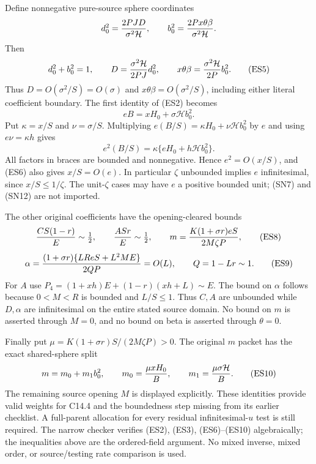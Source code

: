 Define nonnegative pure-source sphere coordinates
\[
 d_0^2={2PJD\over\sigma^2\mathcal H},\qquad
 b_0^2={2Px\theta\beta\over\sigma^2\mathcal H}.
\]
Then
\[
 d_0^2+b_0^2=1,\qquad
 D={\sigma^2\mathcal H\over2PJ}d_0^2,\qquad
 x\theta\beta={\sigma^2\mathcal H\over2P}b_0^2.
                                                               \tag{ES5}
\]
Thus $D=O(\sigma^2/S)=O(\sigma)$ and
$x\theta\beta=O(\sigma^2/S)$, including either literal coefficient
boundary. The first identity of (ES2) becomes
\[
 eB=xH_0+\sigma\mathcal H b_0^2.                     \tag{ES6}
\]
Put $\kappa=x/S$ and $\nu=\sigma/S$. Multiplying
$e(B/S)=\kappa H_0+\nu\mathcal H b_0^2$ by $e$ and using
$e\nu=\kappa h$ gives
\[
 e^2(B/S)=\kappa\{eH_0+h\mathcal H b_0^2\}.
                                                               \tag{ES7}
\]
All factors in braces are bounded and nonnegative. Hence
$e^2=O(x/S)$, and (ES6) also gives $x/S=O(e)$.
In particular $\zeta$ unbounded implies $e$ infinitesimal,
since $x/S\le1/\zeta$. The unit-$\zeta$ cases may have
$e$ a positive bounded unit; (SN7) and (SN12) are not imported.

The other original coefficients have the opening-cleared bounds
\[
 {CS(1-r)\over E}\sim\tfrac12,\qquad
 {ASr\over E}\sim\tfrac12,\qquad
 m={K(1+\sigma r)eS\over2M\zeta P},                  \tag{ES8}
\]
\[
 \alpha={(1+\sigma r)\{LR eS+L^2ME\}\over2QP}
       =O(L),\qquad Q=1-Lr\sim1.                   \tag{ES9}
\]
For $A$ use $P_4=(1+xh)E+(1-r)(xh+L)\sim E$.
The bound on $\alpha$ follows because $0<M<R$ is bounded and
$L/S\le1$. Thus $C,A$ are unbounded while $D,\alpha$ are
infinitesimal on the entire stated source domain. No bound on $m$
is asserted through $M=0$, and no bound on beta is asserted through
$\theta=0$.

Finally put $\mu=K(1+\sigma r)S/(2M\zeta P)>0$. The
original $m$ packet has the exact shared-sphere split
\[
 m=m_0+m_1b_0^2,\qquad
 m_0={\mu xH_0\over B},\qquad
 m_1={\mu\sigma\mathcal H\over B}.                  \tag{ES10}
\]
The remaining source opening $M$ is displayed explicitly. These
identities provide valid weights for C14.4 and the boundedness step
missing from its earlier checklist. A full-parent allocation for every
residual infinitesimal-$u$ test is still required. The narrow checker
verifies (ES2), (ES3), (ES6)--(ES10) algebraically; the inequalities
above are the ordered-field argument. No mixed inverse, mixed order,
or source/testing rate comparison is used.
